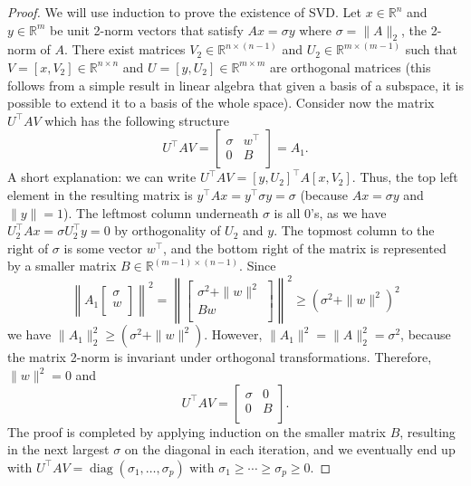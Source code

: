 \begin{proof}
We will use induction to prove the existence of SVD. Let $x \in \mathbb{R}^n$ and $y\in \mathbb{R}^m$ be
unit 2-norm vectors that satisfy $Ax = \sigma y$ where $\sigma = \|A\|_2$, the 2-norm of $A$. There
exist matrices $V_2 \in \mathbb{R}^{n\times (n-1)}$ and $U_2 \in \mathbb{R}^{m\times (m-1)}$ such that $V =
[x, V_2] \in \mathbb{R}^{n\times n}$ and $U = [y, U_2] \in \mathbb{R}^{m\times m}$ are orthogonal matrices (this follows from a simple result in linear algebra that given a basis of a subspace, it is possible to extend it to a basis of the whole space). Consider now the matrix $U^\top   A V$ which has the following structure
$$U^\top   A V = \left[\begin{array}{cc}
                      \sigma & w^\top   \\
                      0 & B \\
                    \end{array}
 \right] = A_1.$$
A short explanation: we can write $U^\top  AV = [y, U_2]^\top   A [x, V_2]$. Thus, the top left element in
the resulting matrix is $y^\top   A x = y^\top   \sigma y = \sigma$ (because $Ax = \sigma y$ and $\|y\|=1$).
The leftmost column underneath $\sigma$ is all 0's, as we have $U_2^\top   Ax = \sigma U_2^\top  
y = 0$ by orthogonality of $U_2$ and $y$. The topmost column to the right of $\sigma$ is some vector $w^\top  $, and the bottom right of
the matrix is represented by a smaller matrix $B\in \mathbb{R}^{(m-1)\times (n-1)}$.
Since
$$\left\|A_1 \left[
          \begin{array}{c}
            \sigma \\
            w \\
          \end{array}
        \right]
 \right\|^2 = \left\|\left[
          \begin{array}{c}
            \sigma^2 + \|w\|^2 \\
            Bw \\
          \end{array}
        \right]\right\|^2 \geq (\sigma^2 + \|w\|^2)^2$$
we have $\|A_1\|_2^2 \geq (\sigma^2 + \|w\|^2)$. However, $\|A_1\|^2  = \|A\|_2^2 = \sigma^2$, because the matrix 2-norm is invariant under orthogonal transformations. Therefore, $\|w\|^2 = 0$ and $$U^\top   A V = \left[\begin{array}{cc}
                      \sigma & 0 \\
                      0 & B \\
                    \end{array}
 \right].$$ The proof is completed by applying induction on the smaller
matrix $B$, resulting in the next largest $\sigma$ on the diagonal in each iteration, and we
eventually end up with $U^\top  AV = \operatorname{diag}(\sigma_1, \ldots, \sigma_p)$ with $\sigma_1 \geq \cdots \geq \sigma_p \geq 0$.
\end{proof}



